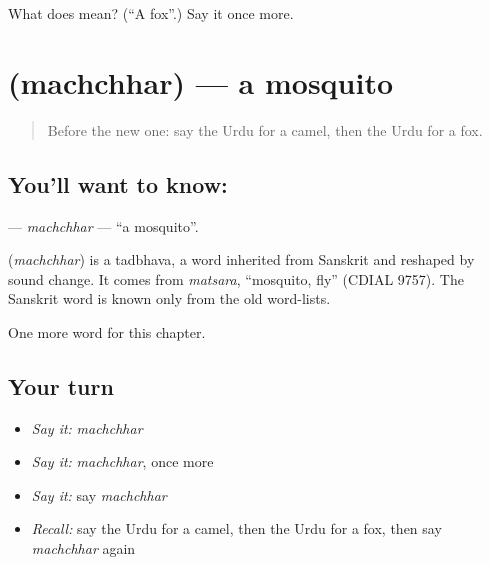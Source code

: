 \begin{tcolorbox}[breakable,colback=teal!4,colframe=teal!35!black,title={Before you move on}]
What does  mean? (\textquotedblleft{}A fox\textquotedblright{}.) Say it once more.
\end{tcolorbox}
\section[\texorpdfstring{\ur{مچھر} (machchhar)}{مچھر (machchhar)}]{ (machchhar) — a mosquito}

\label{lesson:UR-C127-machchhar}



\begin{quote}
Before the new one: say the Urdu for a camel, then the Urdu for a fox.
\end{quote}

\subsection*{You'll want to know: }
\textbf{} — \emph{machchhar} — \textquotedblleft{}a mosquito\textquotedblright{}.

\begin{cousinweb}
\textbf{} (\emph{machchhar}) is a tadbhava, a word inherited from Sanskrit and reshaped by sound change. It comes from \emph{matsara}, \textquotedblleft{}mosquito, fly\textquotedblright{} (CDIAL 9757). The Sanskrit word is known only from the old word-lists.
\end{cousinweb}

\begin{grammarlens}[title={What you've built}]
One more word for this chapter.
\end{grammarlens}

\subsection*{Your turn}
\begin{itemize}
\raggedright
  \item \emph{Say it:} \emph{machchhar}
  \item \emph{Say it:} \emph{machchhar}, once more
  \item \emph{Say it:} say \emph{machchhar}
  \item \emph{Recall:} say the Urdu for a camel, then the Urdu for a fox, then say \emph{machchhar} again
\end{itemize}

